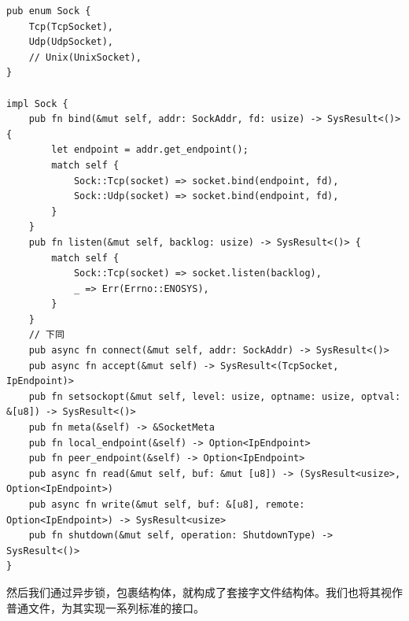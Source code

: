 \documentclass{article}
\begin{document}
\begin{lstlisting}
pub enum Sock {
    Tcp(TcpSocket),
    Udp(UdpSocket),
    // Unix(UnixSocket),
}

impl Sock {
    pub fn bind(&mut self, addr: SockAddr, fd: usize) -> SysResult<()> {
        let endpoint = addr.get_endpoint();
        match self {
            Sock::Tcp(socket) => socket.bind(endpoint, fd),
            Sock::Udp(socket) => socket.bind(endpoint, fd),
        }
    }
    pub fn listen(&mut self, backlog: usize) -> SysResult<()> {
        match self {
            Sock::Tcp(socket) => socket.listen(backlog),
            _ => Err(Errno::ENOSYS),
        }
    }
    // 下同
    pub async fn connect(&mut self, addr: SockAddr) -> SysResult<()>
    pub async fn accept(&mut self) -> SysResult<(TcpSocket, IpEndpoint)>
    pub fn setsockopt(&mut self, level: usize, optname: usize, optval: &[u8]) -> SysResult<()>
    pub fn meta(&self) -> &SocketMeta
    pub fn local_endpoint(&self) -> Option<IpEndpoint>
    pub fn peer_endpoint(&self) -> Option<IpEndpoint>
    pub async fn read(&mut self, buf: &mut [u8]) -> (SysResult<usize>, Option<IpEndpoint>)
    pub async fn write(&mut self, buf: &[u8], remote: Option<IpEndpoint>) -> SysResult<usize>
    pub fn shutdown(&mut self, operation: ShutdownType) -> SysResult<()>
}
\end{lstlisting}

然后我们通过异步锁，包裹结构体，就构成了套接字文件结构体。我们也将其视作普通文件，为其实现一系列标准的接口。
\end{document}
